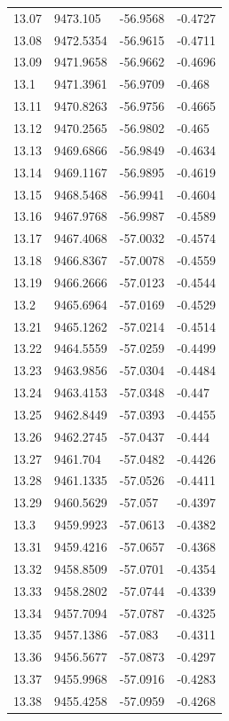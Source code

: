 \begin{table}[H]
\begin{tabular}{llll}
13.07 & 9473.105 & -56.9568 & -0.4727 \\
13.08 & 9472.5354 & -56.9615 & -0.4711 \\
13.09 & 9471.9658 & -56.9662 & -0.4696 \\
13.1 & 9471.3961 & -56.9709 & -0.468 \\
13.11 & 9470.8263 & -56.9756 & -0.4665 \\
13.12 & 9470.2565 & -56.9802 & -0.465 \\
13.13 & 9469.6866 & -56.9849 & -0.4634 \\
13.14 & 9469.1167 & -56.9895 & -0.4619 \\
13.15 & 9468.5468 & -56.9941 & -0.4604 \\
13.16 & 9467.9768 & -56.9987 & -0.4589 \\
13.17 & 9467.4068 & -57.0032 & -0.4574 \\
13.18 & 9466.8367 & -57.0078 & -0.4559 \\
13.19 & 9466.2666 & -57.0123 & -0.4544 \\
13.2 & 9465.6964 & -57.0169 & -0.4529 \\
13.21 & 9465.1262 & -57.0214 & -0.4514 \\
13.22 & 9464.5559 & -57.0259 & -0.4499 \\
13.23 & 9463.9856 & -57.0304 & -0.4484 \\
13.24 & 9463.4153 & -57.0348 & -0.447 \\
13.25 & 9462.8449 & -57.0393 & -0.4455 \\
13.26 & 9462.2745 & -57.0437 & -0.444 \\
13.27 & 9461.704 & -57.0482 & -0.4426 \\
13.28 & 9461.1335 & -57.0526 & -0.4411 \\
13.29 & 9460.5629 & -57.057 & -0.4397 \\
13.3 & 9459.9923 & -57.0613 & -0.4382 \\
13.31 & 9459.4216 & -57.0657 & -0.4368 \\
13.32 & 9458.8509 & -57.0701 & -0.4354 \\
13.33 & 9458.2802 & -57.0744 & -0.4339 \\
13.34 & 9457.7094 & -57.0787 & -0.4325 \\
13.35 & 9457.1386 & -57.083 & -0.4311 \\
13.36 & 9456.5677 & -57.0873 & -0.4297 \\
13.37 & 9455.9968 & -57.0916 & -0.4283 \\
13.38 & 9455.4258 & -57.0959 & -0.4268 \\

\end{tabular}
\end{table}
